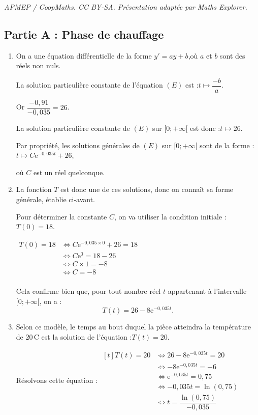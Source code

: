\documentclass[10pt]{article}
\providecommand{\e}{{\mathrm{e}}}
\begin{document}
\noindent\textit{APMEP / CoopMaths. CC BY-SA. Présentation adaptée par Maths Explorer.}\par\medskip
\subsection*{Partie A : Phase de chauffage}
		\begin{enumerate}
			\item On a une équation différentielle de la forme \quad $y' = a y + b$,\quad où $a$ et $b$ sont des réels non nuls.

			La solution particulière constante de l'équation $(E)$ est :\quad $t \longmapsto \dfrac{-b}{a}$.

			Or \quad $\dfrac{-0,91}{-0,035} = 26$.

			La solution particulière constante de $(E)$ sur $[0 ; +\infty[$ est donc :\quad $t \longmapsto 26$.

			Par propriété, les solutions générales de $(E)$ sur $[0 ; +\infty[$ sont de la forme :\quad $t \longmapsto C\e^{-0,035t} + 26$,

			où $C$ est un réel quelconque.

			\item La fonction $T$ est donc une de ces solutions, donc on connaît sa forme générale, établie ci-avant.

			Pour déterminer la constante $C$, on va utiliser la condition initiale :\quad $T(0) = 18$.

			$\begin{aligned}
				T(0) = 18
					&\iff C\e^{-0,035\times 0} + 26 = 18\\
					&\iff C\e^{0} = 18 - 26\\
					&\iff C\times 1 = -8\\
					&\iff C = -8\\
			\end{aligned}$

			Cela confirme bien que, pour tout nombre réel $t$ appartenant à l'intervalle $[0 ;+\infty[$, on a :
			\[ T(t)=26-8 \e^{-0,035 t}.\]

			\item Selon ce modèle, le temps au bout duquel la pièce atteindra la température de 20\,\textdegree{}C est la solution de l'équation :\quad $T(t) = 20$.

			Résolvons cette équation : \quad$\begin{aligned}[t]
				T(t) = 20
					&\iff 26 - 8\e^{-0,035t} = 20\\
					&\iff -8\e^{-0,035t} = - 6\\
					&\iff \e^{-0,035t} = 0,75\\
					&\iff -0,035t = \ln(0,75)\\
					&\iff t = \dfrac{\ln(0,75)}{-0,035}
				\end{aligned}$


\end{enumerate}
\end{document}
